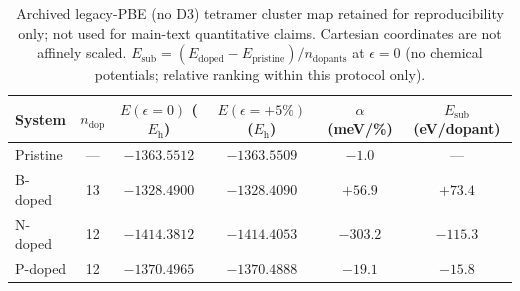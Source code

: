\begin{table}[t]
\caption{\label{tab:legacy_pbe}Archived legacy-PBE (no D3) tetramer cluster map retained for reproducibility only; not used for main-text quantitative claims. Cartesian coordinates are not affinely scaled.
$E_{\mathrm{sub}}=(E_{\mathrm{doped}}-E_{\mathrm{pristine}})/n_{\mathrm{dopants}}$ at $\epsilon{=}0$ (no chemical potentials; relative ranking within this protocol only).}
\begin{ruledtabular}
\begin{tabular}{lccccc}
System & $n_{\mathrm{dop}}$ & $E(\epsilon{=}0)$ ($E_{\mathrm{h}}$) & $E(\epsilon{=}+5\%)$ ($E_{\mathrm{h}}$) & $\alpha$ (meV/\%) & $E_{\mathrm{sub}}$ (eV/dopant) \\
\hline
Pristine & --- & $-1363.5512$ & $-1363.5509$ & $-1.0$ & --- \\
B-doped & 13 & $-1328.4900$ & $-1328.4090$ & $+56.9$ & $+73.4$ \\
N-doped & 12 & $-1414.3812$ & $-1414.4053$ & $-303.2$ & $-115.3$ \\
P-doped & 12 & $-1370.4965$ & $-1370.4888$ & $-19.1$ & $-15.8$ \\
\end{tabular}
\end{ruledtabular}
\end{table}
